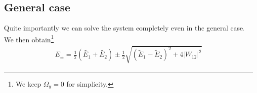 \subsection{General case}

Quite importantly we can solve the system completely even in the general case. We then obtain\footnote{We keep $\Omega_y =0$ for simplicity.}
\begin{align}\label{eq:Epm}
 E_\pm = \frac{1}{2}\left(\tilde{E_1}+\tilde{E_2}\right) \pm \frac{1}{2} \sqrt{\left(\tilde{E}_1-\tilde{E}_2\right)^2+4 \left|W_{12}\right|^2}
\end{align}